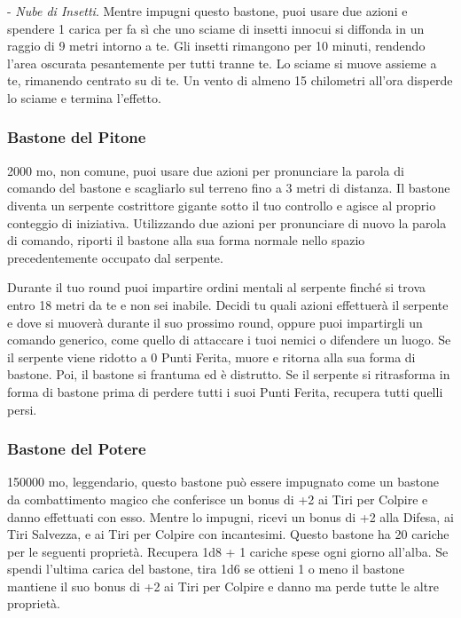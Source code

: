 \begin{multicols}{2}
- \textit{Nube di Insetti}. Mentre impugni questo bastone, puoi usare due azioni e spendere 1 carica per fa sì che uno sciame di insetti innocui si diffonda in un raggio di 9 metri intorno a te. Gli insetti rimangono per 10 minuti, rendendo l'area oscurata pesantemente per tutti tranne te. Lo sciame si muove assieme a te, rimanendo centrato su di te. Un vento di almeno 15 chilometri all'ora disperde lo sciame e termina l'effetto.

\subsubsection*{Bastone del Pitone}
2000 mo, non comune, puoi usare due azioni per pronunciare la parola di comando del bastone e scagliarlo sul terreno fino a 3 metri di distanza. Il bastone diventa un serpente costrittore gigante sotto il tuo controllo e agisce al proprio conteggio di iniziativa. Utilizzando due azioni per pronunciare di nuovo la parola di comando, riporti il bastone alla sua forma normale nello spazio precedentemente occupato dal serpente.

Durante il tuo round puoi impartire ordini mentali al serpente finché si trova entro 18 metri da te e non sei inabile. Decidi tu quali azioni effettuerà il serpente e dove si muoverà durante il suo prossimo round, oppure puoi impartirgli un comando generico, come quello di attaccare i tuoi nemici o difendere un luogo. Se il serpente viene ridotto a 0 Punti Ferita, muore e ritorna alla sua forma di bastone. Poi, il bastone si frantuma ed è distrutto. Se il serpente si ritrasforma in forma di bastone prima di perdere tutti i suoi Punti Ferita, recupera tutti quelli persi.

\subsubsection*{Bastone del Potere}
150000 mo, leggendario, questo bastone può essere impugnato come un bastone da combattimento magico che conferisce un bonus di +2 ai Tiri per Colpire e danno effettuati con esso. Mentre lo impugni, ricevi un bonus di +2 alla Difesa, ai Tiri Salvezza, e ai Tiri per Colpire con incantesimi. Questo bastone ha 20 cariche per le seguenti proprietà. Recupera 1d8 + 1 cariche spese ogni giorno all'alba. Se spendi l'ultima carica del bastone, tira 1d6 se ottieni 1 o meno il bastone mantiene il suo bonus di +2 ai Tiri per Colpire e danno ma perde tutte le altre proprietà.


\end{multicols}
